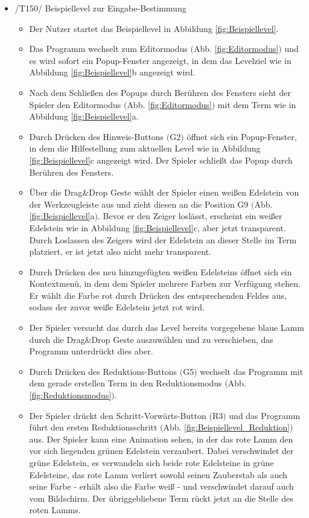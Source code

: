 \begin{itemize}
\item /T150/ Beispiellevel zur Eingabe-Bestimmung
\begin{itemize}
\item Der Nutzer startet das Beispiellevel in Abbildung \ref{fig:Beispiellevel}.
\item Das Programm wechselt zum Editormodus $($Abb. \ref{fig:Editormodus}$)$ und es wird sofort ein Popup-Fenster angezeigt, in dem das Levelziel wie in Abbildung \ref{fig:Beispiellevel}b angezeigt wird.
\item Nach dem Schließen des Popups durch Berühren des Fensters sieht der Spieler den Editormodus $($Abb. \ref{fig:Editormodus}$)$ mit dem Term wie in Abbildung \ref{fig:Beispiellevel}a.
\item Durch Drücken des Hinweis-Buttons $($G2$)$ öffnet sich ein Popup-Fenster, in dem die Hilfestellung zum aktuellen Level wie in Abbildung \ref{fig:Beispiellevel}c angezeigt wird. Der Spieler schließt das Popup durch Berühren des Fensters.
\item Über die Drag$\&$Drop Geste wählt der Spieler einen weißen Edelstein von der Werkzeugleiste aus und zieht diesen an die Position G9 $($Abb. \ref{fig:Beispiellevel}a$)$. Bevor er den Zeiger loslässt, erscheint ein weißer Edelstein wie in Abbildung \ref{fig:Beispiellevel}c, aber jetzt transparent. Durch Loslassen des Zeigers wird der Edelstein an dieser Stelle im Term platziert, er ist jetzt also nicht mehr transparent.
\item Durch Drücken des neu hinzugefügten weißen Edelsteins öffnet sich ein Kontextmenü, in dem dem Spieler mehrere Farben zur Verfügung stehen. Er wählt die Farbe rot durch Drücken des entsprechenden Feldes aus, sodass der zuvor weiße Edelstein jetzt rot wird.
\item Der Spieler versucht das durch das Level bereits vorgegebene blaue Lamm durch die Drag$\&$Drop Geste auszuwählen und zu verschieben, das Programm unterdrückt dies aber.
\item Durch Drücken des Reduktions-Buttons $($G5$)$ wechselt das Programm mit dem gerade erstellen Term in den Reduktionsmodus $($Abb. \ref{fig:Reduktionsmodus}$)$.
\item Der Spieler drückt den Schritt-Vorwärts-Button $($R3$)$ und das Programm führt den ersten Reduktionsschritt $($Abb. \ref{fig:Beispiellevel_Reduktion}$)$ aus. Der Spieler kann eine Animation sehen, in der das rote Lamm den vor sich liegenden grünen Edelstein verzaubert. Dabei verschwindet der grüne Edelstein, es verwandeln sich beide rote Edelsteine in grüne Edelsteine, das rote Lamm verliert sowohl seinen Zauberstab als auch seine Farbe - erhält also die Farbe weiß - und verschwindet darauf auch vom Bildschirm. Der übriggebliebene Term rückt jetzt an die Stelle des roten Lamms.

\end{itemize}
\end{itemize}
